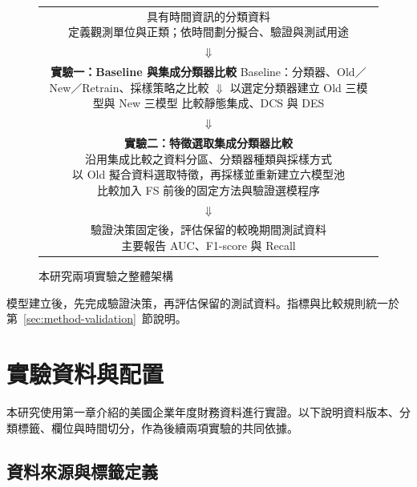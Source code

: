 \begin{figure}[htbp]
\centering
\begingroup
\small
{}
\setlength{\fboxsep}{8pt}
\begin{tabular}{@{}c@{}}
\fbox{\parbox{0.88\linewidth}{\centering 具有時間資訊的分類資料\\
定義觀測單位與正類；依時間劃分擬合、驗證與測試用途}}\\[3pt]
\(\Downarrow\)\\[3pt]
\fbox{\parbox{0.88\linewidth}{\centering\textbf{實驗一：Baseline 與集成分類器比較}\\[4pt]
Baseline：分類器、Old／New／Retrain、採樣策略之比較\\
\(\Downarrow\)\\
以選定分類器建立 Old 三模型與 New 三模型\\
比較靜態集成、DCS 與 DES}}\\[3pt]
\(\Downarrow\)\\[3pt]
\fbox{\parbox{0.88\linewidth}{\centering\textbf{實驗二：特徵選取集成分類器比較}\\[4pt]
沿用集成比較之資料分區、分類器種類與採樣方式\\
以 Old 擬合資料選取特徵，再採樣並重新建立六模型池\\
比較加入 FS 前後的固定方法與驗證選模程序}}\\[3pt]
\(\Downarrow\)\\[3pt]
\fbox{\parbox{0.88\linewidth}{\centering 驗證決策固定後，評估保留的較晚期間測試資料\\
主要報告 AUC、F1-score 與 Recall}}
\end{tabular}
\endgroup
\caption{本研究兩項實驗之整體架構}\label{fig:method-overview}
\par{}
\end{figure}

模型建立後，先完成驗證決策，再評估保留的測試資料。指標與比較規則統一於第~\ref{sec:method-validation}~節說明。

\clearpage
\section{實驗資料與配置}\label{sec:method-data}

本研究使用第一章介紹的美國企業年度財務資料進行實證。以下說明資料版本、分類標籤、欄位與時間切分，作為後續兩項實驗的共同依據。

\subsection{資料來源與標籤定義}

